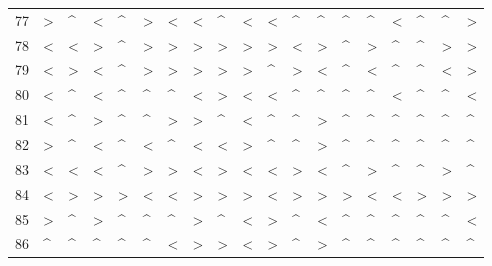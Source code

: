 \begin{tabular}{lllllllllllllllllll}
77  &  > &  \textasciicircum  &  < &  \textasciicircum  &  > &  < &  < &  \textasciicircum  &  < &  < &  \textasciicircum  &  \textasciicircum  &  \textasciicircum  &  \textasciicircum  &  < &  \textasciicircum  &  \textasciicircum  &  > \\
78  &  < &  < &  > &  \textasciicircum  &  > &  > &  > &  > &  > &  > &  < &  > &  \textasciicircum  &  > &  \textasciicircum  &  \textasciicircum  &  > &  > \\
79  &  < &  > &  < &  \textasciicircum  &  > &  > &  > &  > &  > &  \textasciicircum  &  > &  < &  \textasciicircum  &  < &  \textasciicircum  &  \textasciicircum  &  < &  > \\
80  &  < &  \textasciicircum  &  < &  \textasciicircum  &  \textasciicircum  &  \textasciicircum  &  < &  > &  < &  < &  \textasciicircum  &  \textasciicircum  &  \textasciicircum  &  \textasciicircum  &  < &  \textasciicircum  &  \textasciicircum  &  < \\
81  &  < &  \textasciicircum  &  > &  \textasciicircum  &  \textasciicircum  &  > &  > &  \textasciicircum  &  < &  \textasciicircum  &  \textasciicircum  &  > &  \textasciicircum  &  \textasciicircum  &  \textasciicircum  &  \textasciicircum  &  \textasciicircum  &  \textasciicircum  \\
82  &  > &  \textasciicircum  &  < &  \textasciicircum  &  < &  \textasciicircum  &  < &  < &  > &  \textasciicircum  &  \textasciicircum  &  > &  \textasciicircum  &  \textasciicircum  &  \textasciicircum  &  \textasciicircum  &  \textasciicircum  &  \textasciicircum  \\
83  &  < &  < &  < &  \textasciicircum  &  > &  > &  < &  > &  < &  < &  > &  < &  \textasciicircum  &  > &  \textasciicircum  &  \textasciicircum  &  > &  \textasciicircum  \\
84  &  < &  > &  > &  > &  < &  < &  > &  > &  > &  < &  > &  > &  > &  < &  < &  > &  > &  > \\
85  &  > &  \textasciicircum  &  > &  \textasciicircum  &  \textasciicircum  &  \textasciicircum  &  > &  \textasciicircum  &  < &  > &  \textasciicircum  &  < &  \textasciicircum  &  \textasciicircum  &  \textasciicircum  &  \textasciicircum  &  \textasciicircum  &  < \\
86  &  \textasciicircum  &  \textasciicircum  &  \textasciicircum  &  \textasciicircum  &  \textasciicircum  &  < &  > &  > &  < &  > &  \textasciicircum  &  > &  \textasciicircum  &  \textasciicircum  &  \textasciicircum  &  \textasciicircum  &  \textasciicircum  &  \textasciicircum  \\

\end{tabular}
